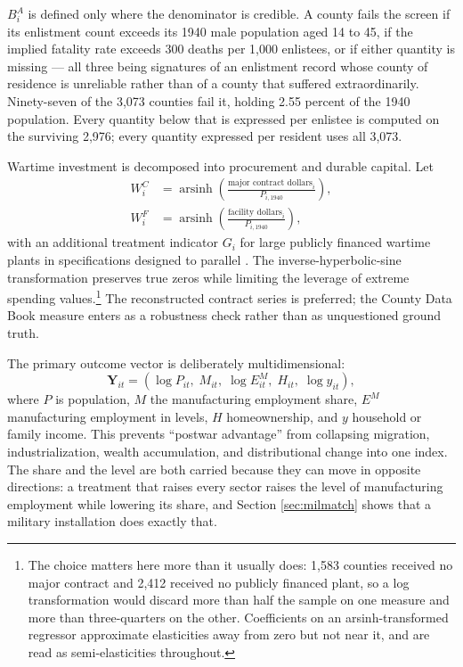 \documentclass[12pt]{article}
\DeclareMathOperator{\arsinh}{arsinh}
\newcommand{\textcite}[1]{\citet{#1}}
\begin{document}
$B_i^{A}$ is defined only where the denominator is credible. A county fails the
screen if its enlistment count exceeds its 1940 male population aged 14 to 45,
if the implied fatality rate exceeds 300 deaths per 1{,}000 enlistees, or if
either quantity is missing --- all three being signatures of an enlistment
record whose county of residence is unreliable rather than of a county that
suffered extraordinarily. Ninety-seven of the 3{,}073 counties fail it, holding
2.55 percent of the 1940 population. Every quantity below that is expressed per
enlistee is computed on the surviving 2{,}976; every quantity expressed per
resident uses all 3{,}073.

Wartime investment is decomposed into procurement and durable capital. Let
\begin{align}
W_i^{C}&=\arsinh\!\left(\frac{\text{major contract dollars}_i}{P_{i,1940}}\right),\\
W_i^{F}&=\arsinh\!\left(\frac{\text{facility dollars}_i}{P_{i,1940}}\right),
\end{align}
with an additional treatment indicator $G_i$ for large publicly financed wartime plants in specifications designed to parallel \textcite{garin2025}. The inverse-hyperbolic-sine transformation preserves true zeros while limiting the leverage of extreme spending values.\footnote{The choice matters here more than it usually does: 1{,}583 counties received no major contract and 2{,}412 received no publicly financed plant, so a log transformation would discard more than half the sample on one measure and more than three-quarters on the other. Coefficients on an arsinh-transformed regressor approximate elasticities away from zero but not near it, and are read as semi-elasticities throughout.} The reconstructed contract series is preferred; the County Data Book measure enters as a robustness check rather than as unquestioned ground truth.

The primary outcome vector is deliberately multidimensional:
\begin{equation}
\mathbf{Y}_{it}=\left(\log P_{it},\;M_{it},\;\log E^{M}_{it},\;H_{it},\;\log y_{it}\right),
\end{equation}
where $P$ is population, $M$ the manufacturing employment share, $E^M$ manufacturing employment in levels, $H$ homeownership, and $y$ household or family income. This prevents ``postwar advantage'' from collapsing migration, industrialization, wealth accumulation, and distributional change into one index. The share and the level are both carried because they can move in opposite directions: a treatment that raises every sector raises the level of manufacturing employment while lowering its share, and Section \ref{sec:milmatch} shows that a military installation does exactly that.
\end{document}
